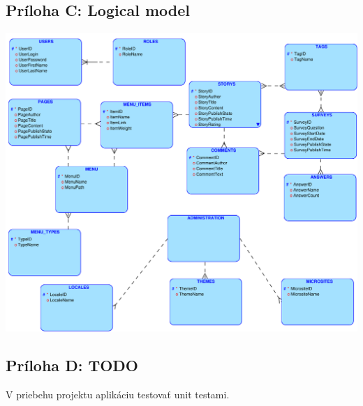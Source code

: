 \documentclass[a4paper,titlepage,11pt]{article}
\begin{document}
\subsection*{Príloha C: Logical model}
\includegraphics[width=\textwidth]{schema.pdf}

\subsection*{Príloha D: TODO}
V priebehu projektu aplikáciu testovať unit testami.
\end{document}
